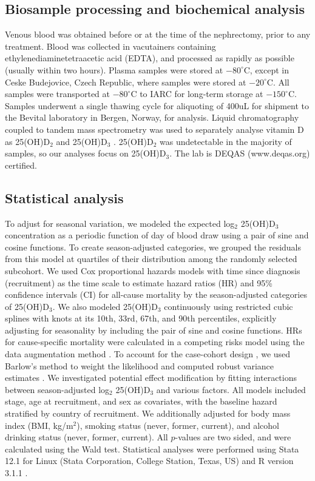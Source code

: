 \documentclass[a4paper,11pt]{article}
\begin{document}
\subsection*{Biosample processing and biochemical analysis}
Venous blood was obtained before or at the time of the nephrectomy, prior to 
any treatment. Blood was collected in vacutainers containing 
ethylenediaminetetraacetic acid (EDTA), and processed as rapidly as possible 
(usually within two hours). Plasma samples were stored at $-80^{\circ}$C, 
except in Ceske Budejovice, Czech Republic, where samples were stored at 
$-20^{\circ}$C. All samples were transported at $-80^{\circ}$C to IARC for 
long-term storage at $-150^{\circ}$C. Samples underwent a single thawing cycle 
for aliquoting of 400uL for shipment to the Bevital laboratory in Bergen, 
Norway, for analysis. Liquid chromatography coupled to tandem 
mass spectrometry was used to separately analyse vitamin D as 25(OH)D$_2$ and 
25(OH)D$_3$ \cite{midttun_determination_2011}. 25(OH)D$_2$ was undetectable in 
the majority of samples, so our analyses focus on 25(OH)D$_3$. The lab is DEQAS 
(www.deqas.org) certified.

\subsection*{Statistical analysis}
To adjust for seasonal variation, we modeled the expected log$_2$ 25(OH)D$_3$ 
concentration as a periodic function of day of blood draw using a pair of sine 
and cosine functions. To create season-adjusted categories, we grouped the 
residuals from this model at quartiles of their distribution among the randomly 
selected subcohort. We used Cox proportional hazards models with time since 
diagnosis (recruitment) as the time scale to estimate hazard ratios (HR) and 
95\% confidence intervals (CI) for all-cause mortality by the season-adjusted 
categories of 25(OH)D$_3$. We also modeled 25(OH)D$_3$ continuously using 
restricted cubic splines with knots at its 10th, 33rd, 67th, and 90th 
percentiles, explicitly adjusting for seasonality by including the pair of sine 
and cosine functions. HRs for cause-specific mortality were calculated in a 
competing risks model using the data augmentation method 
\cite{lunn_applying_1995}. To account for the case-cohort design 
\cite{prentice_case-cohort_1986}, we used Barlow's method to weight the 
likelihood and computed robust variance estimates \cite{barlow_robust_1994, 
barlow_analysis_1999}. We investigated potential effect modification by fitting 
interactions between season-adjusted log$_2$ 25(OH)D$_3$ and various factors. 
All models included stage, age at recruitment, and sex as covariates, with the 
baseline hazard stratified by country of recruitment. We additionally adjusted 
for body mass index (BMI, kg/m$^2$), smoking status (never, former, current), 
and alcohol drinking status (never, former, current).
All $p$-values are two sided, and were calculated using the Wald test. 
Statistical analyses were performed using Stata 12.1 for Linux (Stata 
Corporation, College Station, Texas, US) and R version 3.1.1 \cite{r_2014}.
\end{document}
